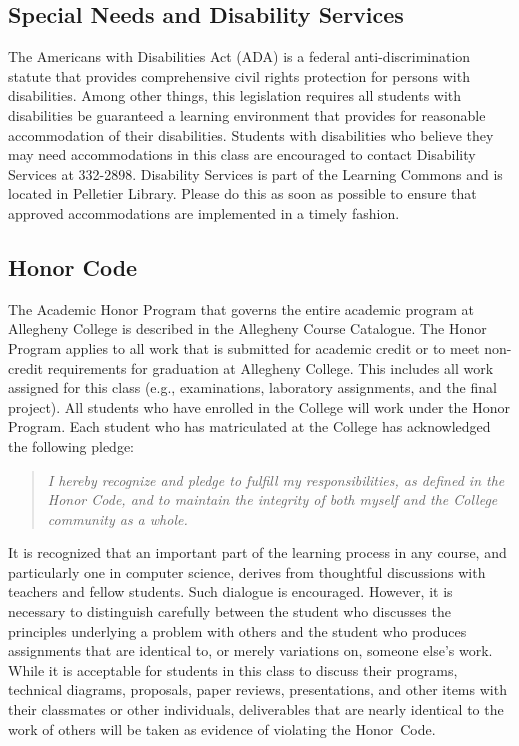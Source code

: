 \documentclass[11pt]{article} %
\begin{document}
\vspace*{-.10in}
\subsection*{\textbf{Special Needs and Disability Services}}

The Americans with Disabilities Act (ADA) is a federal anti-discrimination statute that provides comprehensive civil rights protection for persons with disabilities.  Among other things, this legislation requires all students with disabilities be guaranteed a learning environment that provides for reasonable accommodation of their disabilities. Students with disabilities who believe they may need accommodations in this class are encouraged to contact Disability Services at 332-2898. Disability Services is part of the Learning Commons and is located in Pelletier Library. Please do this as soon as possible to ensure that approved accommodations are implemented in a timely fashion.

\vspace{-.10in}
\subsection*{\textbf{Honor Code}}

The Academic Honor Program that governs the entire academic program at Allegheny College is described in the Allegheny Course Catalogue.  The Honor Program applies to all work that is submitted for academic credit or to meet non-credit requirements for graduation at Allegheny College.  This includes all work assigned for this class (e.g., examinations, laboratory assignments, and the final project).  All students who have enrolled in the College will work under the Honor Program.  Each student who has matriculated at the College has acknowledged the following pledge:

\vspace*{-.1in}
\begin{quote}
\emph{I hereby recognize and pledge to fulfill my responsibilities, as defined in the Honor Code, and to maintain the integrity of both myself and the College community as a whole.}
\end{quote}
\vspace*{-.15in}

\noindent It is recognized that an important part of the learning process in any course, and particularly one in computer science, derives from thoughtful discussions with teachers and fellow students.  Such dialogue is encouraged. However, it is necessary to distinguish carefully between the student who discusses the principles underlying a problem with others and the student who produces assignments that are identical to, or merely variations on, someone else's work.  While it is acceptable for students in this class to discuss their programs, technical diagrams, proposals, paper reviews, presentations, and other items with their classmates or other individuals, deliverables that are nearly identical to the work of others will be taken as evidence of violating the \mbox{Honor Code}.
\end{document}
